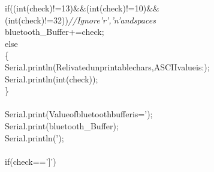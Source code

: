 \documentclass[a4paper, 12pt]{article}
\newcommand\SPC{\hspace*{0.6em}}
\newcommand\BS{\mbox{\char 92}}
\newcommand\QOT{\mbox{\char 34}}
\newcommand{\CppACharacter}[1]{\textcolor[rgb]{0.2,0.4,1}{#1}}
\newcommand{\CppAComment}[1]{\textit{\textcolor[rgb]{0.2,0.4,1}{#1}}}
\newcommand{\CppAIdentifier}[1]{\textcolor[rgb]{0,1,0}{#1}}
\newcommand{\CppANumber}[1]{\textcolor[rgb]{0,0,1}{#1}}
\newcommand{\CppAReservedWord}[1]{\textcolor[rgb]{0,0.5,0}{#1}}
\newcommand{\CppASpace}[1]{\textcolor[rgb]{1,1,1}{\colorbox[rgb]{0,0,0}{#1}}}
\newcommand{\CppAString}[1]{\textcolor[rgb]{0.76,0.76,0.76}{#1}}
\newcommand{\CppASymbol}[1]{\textcolor[rgb]{1,0,0}{#1}}
\begin{document}
\begin{ttfamily}
\CppASpace{\SPC \SPC }\CppAReservedWord{if}\CppASpace{\SPC }\CppASymbol{(}\CppASymbol{(}\CppAReservedWord{int}\CppASymbol{(}\CppAIdentifier{check}\CppASymbol{)}\CppASymbol{!=}\CppASpace{\SPC }\CppANumber{13}\CppASymbol{)}\CppASymbol{\&\&}\CppASymbol{(}\CppAReservedWord{int}\CppASymbol{(}\CppAIdentifier{check}\CppASymbol{)}\CppASymbol{!=}\CppASpace{\SPC }\CppANumber{10}\CppASpace{\SPC }\CppASymbol{)}\CppASymbol{\&\&}\CppASymbol{(}\CppAReservedWord{int}\CppASymbol{(}\CppAIdentifier{check}\CppASymbol{)}\CppASymbol{!=}\CppASpace{\SPC }\CppANumber{32}\CppASymbol{)}\CppASymbol{)}\CppASpace{\SPC }\CppAComment{//Ignore\SPC '\BS r'\SPC ,\SPC '\BS n'\SPC and\SPC spaces}\\
\CppASpace{\SPC \SPC }\CppAIdentifier{bluetooth\_Buffer}\CppASpace{\SPC }\CppASymbol{+=}\CppASpace{\SPC }\CppAIdentifier{check}\CppASymbol{;}\\
\CppASpace{\SPC \SPC }\CppAReservedWord{else}\\
\CppASpace{\SPC \SPC }\CppASymbol{\{}\\
\CppASpace{\SPC \SPC }\CppAIdentifier{Serial}\CppASymbol{.}\CppAIdentifier{println}\CppASymbol{(}\CppAString{\QOT Relivated\SPC unprintable\SPC chars,\SPC ASCII\SPC value\SPC is\SPC :\SPC \QOT }\CppASymbol{)}\CppASymbol{;}\\
\CppASpace{\SPC \SPC }\CppAIdentifier{Serial}\CppASymbol{.}\CppAIdentifier{println}\CppASymbol{(}\CppAReservedWord{int}\CppASymbol{(}\CppAIdentifier{check}\CppASymbol{)}\CppASymbol{)}\CppASymbol{;}\\
\CppASpace{\SPC \SPC }\CppASymbol{\}}\\
\CppASpace{\SPC \SPC }\\
\CppASpace{\SPC \SPC }\CppAIdentifier{Serial}\CppASymbol{.}\CppAIdentifier{print}\CppASymbol{(}\CppAString{\QOT Value\SPC of\SPC bluetooth\SPC buffer\SPC is\SPC =\SPC '\QOT }\CppASymbol{)}\CppASymbol{;}\\
\CppASpace{\SPC \SPC }\CppAIdentifier{Serial}\CppASymbol{.}\CppAIdentifier{print}\CppASymbol{(}\CppAIdentifier{bluetooth\_Buffer}\CppASymbol{)}\CppASymbol{;}\\
\CppASpace{\SPC \SPC }\CppAIdentifier{Serial}\CppASymbol{.}\CppAIdentifier{println}\CppASymbol{(}\CppAString{\QOT '\QOT }\CppASymbol{)}\CppASymbol{;}\\
\CppASpace{\SPC \SPC }\\
\CppASpace{\SPC \SPC }\CppAReservedWord{if}\CppASpace{\SPC }\CppASymbol{(}\CppAIdentifier{check}\CppASymbol{==}\CppACharacter{']'}\CppASymbol{)}\\

\end{ttfamily}
\end{document}
